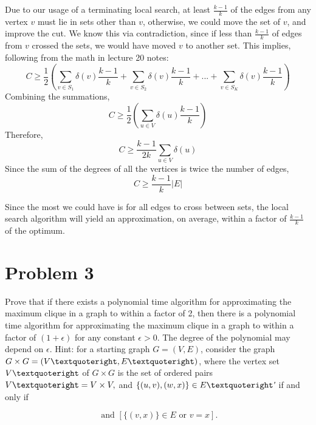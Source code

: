 \documentclass[11pt]{article}
\begin{document}
Due to our usage of a terminating local search, at least $\frac{k-1}{k}$ of the edges from any vertex $v$ must lie in sets other than $v$, otherwise, we could move the set of $v$, and improve the cut. We know this via contradiction, since if less than $\frac{k-1}{k}$ of edges from $v$ crossed the sets, we would have  moved $v$ to another set. This implies, following from the math in lecture 20 notes:
\begin{equation*}
	C \geq \frac{1}{2}(\sum_{v \in S_1} \delta(v)\frac{k-1}{k} + \sum_{v \in S_2} \delta(v)\frac{k-1}{k} + ... + \sum_{v \in S_K} \delta(v)\frac{k-1}{k})	
\end{equation*}
Combining the summations,
\begin{equation*}
	C \geq \frac{1}{2}(\sum_{u \in V} \delta(u)\frac{k-1}{k})	
\end{equation*}
Therefore,
\begin{equation*}
	C \geq \frac{k-1}{2k}\sum_{u \in V} \delta(u)
\end{equation*}
Since the sum of the degrees of all the vertices is twice the number of edges,
\begin{equation*}
	C \geq \frac{k-1}{k}|E|
\end{equation*}

Since the most we could have is for all edges to cross between sets, the local search algorithm will yield an approximation, on average, within a factor of $\frac{k-1}{k}$ of the optimum.

\section{Problem 3}
Prove that if there exists a polynomial time algorithm for approximating the maximum clique in a graph to within a factor of 2, then there is a polynomial time algorithm for approximating the maximum clique in a graph to within a factor of $(1 + \epsilon)$ for any constant $\epsilon > 0$. The degree of the polynomial may depend on $\epsilon$. Hint: for a starting graph $G = (V,E)$, consider the graph $G \times G = (V \textquoteright ,E\textquoteright)$, where the vertex set $V\textquoteright$ of $G \times G$ is the set of ordered pairs $V\textquoteright = V \times V,$ and $\{(u,v),(w,x)\} \in E\textquoteright$′ if and only if

\begin{equation*}
[\{(u,w)\}\in E \text{ or } u=w] \text{ and } [\{(v,x)\}\in E \text{ or } v=x].			
\end{equation*}
\end{document}
